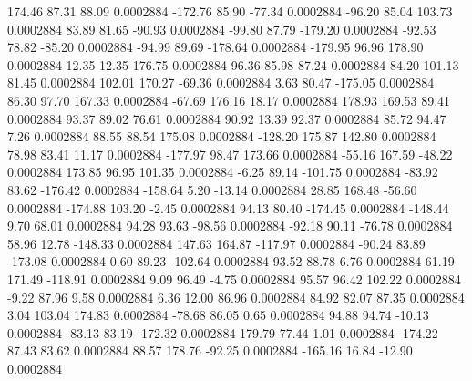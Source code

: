       174.46       87.31       88.09     0.0002884
     -172.76       85.90      -77.34     0.0002884
      -96.20       85.04      103.73     0.0002884
       83.89       81.65      -90.93     0.0002884
      -99.80       87.79     -179.20     0.0002884
      -92.53       78.82      -85.20     0.0002884
      -94.99       89.69     -178.64     0.0002884
     -179.95       96.96      178.90     0.0002884
       12.35       12.35      176.75     0.0002884
       96.36       85.98       87.24     0.0002884
       84.20      101.13       81.45     0.0002884
      102.01      170.27      -69.36     0.0002884
        3.63       80.47     -175.05     0.0002884
       86.30       97.70      167.33     0.0002884
      -67.69      176.16       18.17     0.0002884
      178.93      169.53       89.41     0.0002884
       93.37       89.02       76.61     0.0002884
       90.92       13.39       92.37     0.0002884
       85.72       94.47        7.26     0.0002884
       88.55       88.54      175.08     0.0002884
     -128.20      175.87      142.80     0.0002884
       78.98       83.41       11.17     0.0002884
     -177.97       98.47      173.66     0.0002884
      -55.16      167.59      -48.22     0.0002884
      173.85       96.95      101.35     0.0002884
       -6.25       89.14     -101.75     0.0002884
      -83.92       83.62     -176.42     0.0002884
     -158.64        5.20      -13.14     0.0002884
       28.85      168.48      -56.60     0.0002884
     -174.88      103.20       -2.45     0.0002884
       94.13       80.40     -174.45     0.0002884
     -148.44        9.70       68.01     0.0002884
       94.28       93.63      -98.56     0.0002884
      -92.18       90.11      -76.78     0.0002884
       58.96       12.78     -148.33     0.0002884
      147.63      164.87     -117.97     0.0002884
      -90.24       83.89     -173.08     0.0002884
        0.60       89.23     -102.64     0.0002884
       93.52       88.78        6.76     0.0002884
       61.19      171.49     -118.91     0.0002884
        9.09       96.49       -4.75     0.0002884
       95.57       96.42      102.22     0.0002884
       -9.22       87.96        9.58     0.0002884
        6.36       12.00       86.96     0.0002884
       84.92       82.07       87.35     0.0002884
        3.04      103.04      174.83     0.0002884
      -78.68       86.05        0.65     0.0002884
       94.88       94.74      -10.13     0.0002884
      -83.13       83.19     -172.32     0.0002884
      179.79       77.44        1.01     0.0002884
     -174.22       87.43       83.62     0.0002884
       88.57      178.76      -92.25     0.0002884
     -165.16       16.84      -12.90     0.0002884
